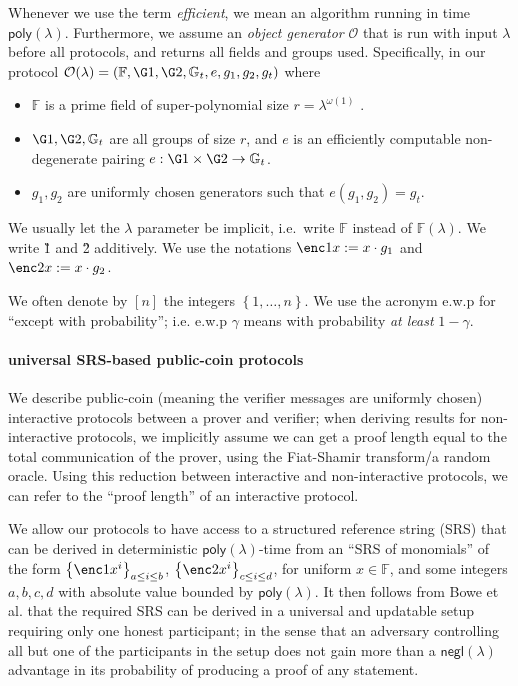 \documentclass[11pt]{article} %
\newcommand{\Gt}{\ensuremath{{\mathbb G}_t}\xspace}
\newcommand{\F}{\ensuremath{\mathbb F}\xspace}
\newcommand{\negl}{\ensuremath{\mathsf{negl}(\lambda)}\xspace}
\newcommand{\defeq}{:=}
\newcommand{\sett}[2]{\ensuremath{\set{#1}_{#2}}\xspace}
\newcommand{\set}[1]{\ensuremath{\left\{#1\right\}}\xspace}
\newcommand{\obgen}{\ensuremath{\mathcal O}\xspace}
\newcommand{\poly}{\ensuremath{\mathsf{poly(\lambda)}}\xspace}
\begin{document}
Whenever we use the term \emph{efficient}, we mean an algorithm running in time \poly. Furthermore,
we assume an \emph{object generator} \obgen that is run with input $\lambda$ before all protocols, and returns all fields and groups used. Specifically, in our protocol $\obgen(\lambda) = (\F, \G1, \G2, \Gt, e, g_1, g_2,g_t)$ where
\begin{itemize}
\item \F is a prime field of super-polynomial size $r = \lambda^{\omega(1)}$
.
\item $\G1,\G2,\Gt$ are all groups of size $r$, and $e$ is an efficiently computable non-degenerate pairing
$e : \G1 \times \G2 \to \Gt$.
\item $g_1,g_2$ are uniformly chosen generators such that $e(g_1, g_2) = g_t$.
\end{itemize}
We usually let the $\lambda$ parameter be implicit, i.e.\ write \F instead of $\F(\lambda)$.
We write \G1 and \G2 additively. We use the notations $\enc1{x}\defeq x\cdot g_1$ and $\enc2{x}\defeq x\cdot g_2$.

We often denote by $[n]$ the integers \set{1,\ldots,n}.
We use the acronym e.w.p for ``except with probability''; i.e. e.w.p $\gamma$ means with probability \emph{at least} $1-\gamma$.

\paragraph{universal SRS-based public-coin protocols}
We describe public-coin (meaning the verifier messages are uniformly chosen) interactive protocols between a prover and verifier; when deriving results for non-interactive protocols, we implicitly assume we can get a proof length equal to the total communication of the prover, using the Fiat-Shamir transform/a random oracle. Using this reduction between interactive and non-interactive protocols, we can refer to the ``proof length'' of an interactive protocol. 

We allow our protocols to have access to a structured reference string (SRS) that can be derived in deterministic \poly-time from an ``SRS of monomials'' of the form
\sett{\enc1{x^i}}{a\leq i \leq b}, \sett{\enc2{x^i}}{c\leq i \leq d}, for uniform $x\in \F$,
and some integers $a,b,c,d$ with absolute value bounded by \poly.
It then follows from Bowe et al. \cite{SecondMPC} that the required SRS can be derived in a universal and updatable setup requiring only one honest participant; in the sense that an adversary controlling all but one of the participants in the setup does not gain more than a \negl advantage in its probability of producing a proof of any statement.
\end{document}
